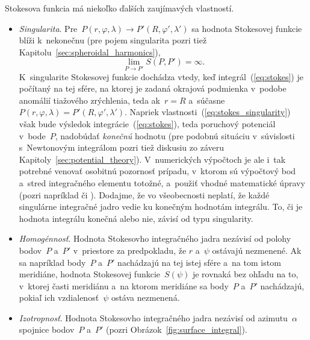 \documentclass[a4paper,12pt]{book}
\begin{document}
Stokesova funkcia má niekoľko ďalších zaujímavých vlastností.
%
\begin{itemize}
\item \emph{Singularita}.  Pre~$P(r, \varphi, \lambda) \rightarrow P'(R, 
\varphi', \lambda')$ sa hodnota Stokesovej funkcie blíži k~nekonečnu (pre pojem 
singularita pozri tiež Kapitolu~\ref{sec:spheroidal_harmonics}),
%
\begin{equation}
\label{eq:stokes_singularity}
\lim\limits_{P \rightarrow P'} S(P, P') = \infty{.}
\end{equation}
%
K~singularite Stokesovej funkcie dochádza vtedy, keď integrál~(\ref{eq:stokes}) 
je počítaný na tej sfére, na ktorej je zadaná okrajová podmienka v~podobe 
anomálií tiažového zrýchlenia, teda ak~$r = R$ a~súčasne~$P(r, \varphi, 
\lambda) = P'(R, \varphi', \lambda')$.  Napriek 
vlastnosti~(\ref{eq:stokes_singularity}) však bude výsledok 
integrácie~(\ref{eq:stokes}), teda poruchový potenciál v~bode~$P$, nadobúdať 
\emph{konečnú} hodnotu (pre podobnú situáciu v~súvislosti s~Newtonovým 
integrálom pozri tiež diskusiu zo záveru Kapitoly~\ref{sec:potential_theory}).  
V~numerických výpočtoch je ale i~tak potrebné venovať osobitnú pozornosť 
prípadu, v~ktorom sú výpočtový bod a~stred integračného elementu totožné, 
a~použiť vhodné matematické úpravy (pozri napríklad 
\cite{MoritzPhysicalGeodesy} či \cite{Hees1991}).  Dodajme, že vo všeobecnosti 
neplatí, že každé singulárne integračné jadro vedie ku konečným hodnotám 
integrálu.  To, či je hodnota integrálu konečná alebo nie, závisí od typu 
singularity.
%
\item \emph{Homogénnosť}.  Hodnota Stokesovho integračného jadra nezávisí od 
polohy bodov~$P$ a~$P'$ v~priestore za predpokladu, že $r$ a~$\psi$ ostávajú 
nezmenené.  Ak sa napríklad body~$P$ a~$P'$ nachádzajú na tej istej sfére a~na 
tom istom meridiáne, hodnota Stokesovej funkcie~$S(\psi)$ je rovnaká bez ohľadu 
na to, v~ktorej časti meridiánu a~na ktorom meridiáne sa body~$P$ a~$P'$ 
nachádzajú, pokiaľ ich vzdialenosť~$\psi$ ostáva nezmenená.
%
\item \emph{Izotropnosť}.  Hodnota Stokesovho integračného jadra nezávisí od 
azimutu~$\alpha$ spojnice bodov~$P$ a~$P'$ (pozri 
Obrázok~\ref{fig:surface_integral}).
\end{itemize}
\end{document}
